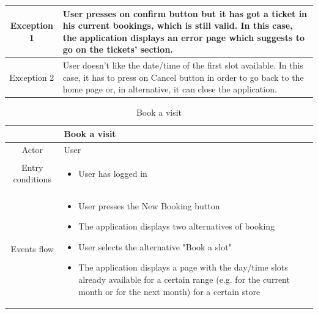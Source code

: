 \documentclass[table, 12pt]{article}
\begin{document}
\begin{minipage}{\textwidth}
\begin{longtable}{|c| p{10cm}|}
        \hline
        \hline
        Exception 1      & User presses on confirm button but it has got a ticket in his current bookings, which is still valid. In this case, the application displays an error page which suggests to go on the tickets' section. \\
        \hline
        Exception 2      & User doesn't like the date/time of the first slot available. In this case, it has to press on Cancel button in order to go back to the home page or, in alternative, it can close the application.       \\
        \hline
    \end{longtable}

\end{minipage}


\begin{minipage}{\textwidth}
    \begin{longtable}{|c| p{10cm}|}
        \caption{Book a visit}                                                                                                                                          \\
        \hline
                         & Book a visit                                                                                                                                 \\
        \hline
        Actor            & User                                                                                                                                         \\
        \hline
        Entry conditions & \begin{itemize}
            \item User has logged in
        \end{itemize}                                                                                                                   \\
        \hline
        Events flow      & \begin{itemize}[nosep,after=\strut]
            \item User presses the New Booking button
            \item The application displays two alternatives of booking
            \item User selects the alternative "Book a slot"
            \item The application displays a page with the day/time slots already available for a certain range (e.g. for the current month or for the next month) for a certain store

\end{itemize}
\end{longtable}
\end{minipage}
\end{document}
